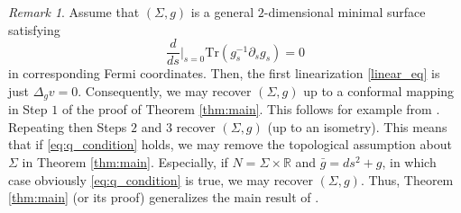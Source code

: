 \documentclass[12pt]{amsart}
\def\p{\partial}
\def\R{\mathbb R}
\theoremstyle{definition}
\theoremstyle{remark}
\newtheorem{remark}[theorem]{Remark}
\begin{document}
\begin{remark}\label{rem:generalization_of_earlier}
 Assume that $(\Sigma,g)$ is a general $2$-dimensional minimal surface satisfying
 \begin{equation}\label{eq:q_condition}
 \frac{d}{d s}\Big|_{s=0}\text{Tr}(g_s^{-1}\p_sg_s)=0
 \end{equation}
 in corresponding Fermi coordinates. Then, the first linearization \eqref{linear_eq} is just $\Delta_gv=0$. Consequently, we may recover $(\Sigma,g)$ up to a conformal mapping in Step $1$ of the proof of Theorem \ref{thm:main}. This follows for example from \cite[Theorem 5.1]{lassas2018poisson}. Repeating then Steps $2$ and $3$  recover $(\Sigma, g)$ (up to an isometry). This means that if \eqref{eq:q_condition} holds,  we may remove the topological assumption about $\Sigma$ in Theorem \ref{thm:main}. Especially, if $N=\Sigma\times\R$ and $\bar g = ds^2+g$, in which case obviously \eqref{eq:q_condition} is true, we may recover $(\Sigma,g)$. Thus, Theorem \ref{thm:main} (or its proof) generalizes the main result of \cite{carstea2022inverse}.
 \end{remark}




\appendix
\end{document}
